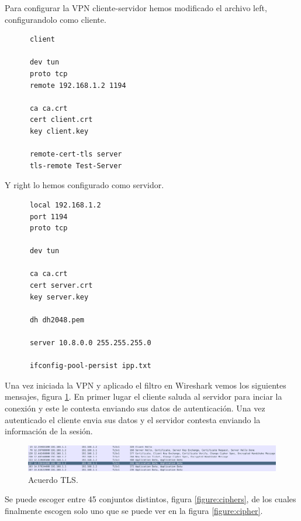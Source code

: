 \documentclass[11pt]{article}
\begin{document}
      \bigskip
      \par
      Para configurar la VPN cliente-servidor hemos modificado el archivo left,
      configurandolo como cliente.
      \begin{lstlisting}
      client

      dev tun
      proto tcp
      remote 192.168.1.2 1194

      ca ca.crt
      cert client.crt
      key client.key

      remote-cert-tls server
      tls-remote Test-Server
      \end{lstlisting}

      \bigskip
      \par
      Y right lo hemos configurado como servidor.
      \begin{lstlisting}
      local 192.168.1.2
      port 1194
      proto tcp

      dev tun

      ca ca.crt
      cert server.crt
      key server.key

      dh dh2048.pem

      server 10.8.0.0 255.255.255.0

      ifconfig-pool-persist ipp.txt
      \end{lstlisting}


      \bigskip
      \par
      Una vez iniciada la VPN y aplicado el filtro en Wireshark vemos los
      siguientes mensajes, figura \ref{figure:tls}. En primer lugar el cliente
      saluda al servidor para inciar la conexión y este le contesta enviando
      sus datos de autenticación. Una vez autenticado el cliente envia sus datos
      y el servidor contesta enviando la información de la sesión.

      \begin{figure}[H]
        \centering
        \includegraphics[width = \textwidth]{tls}
        \caption{Acuerdo TLS.}
        \label{figure:tls}
      \end{figure}


      \par
      Se puede escoger entre 45 conjuntos distintos, figura
      \ref{figure:ciphers}, de los cuales finalmente escogen solo uno que se
      puede ver en la figura \ref{figure:cipher}.
\end{document}
